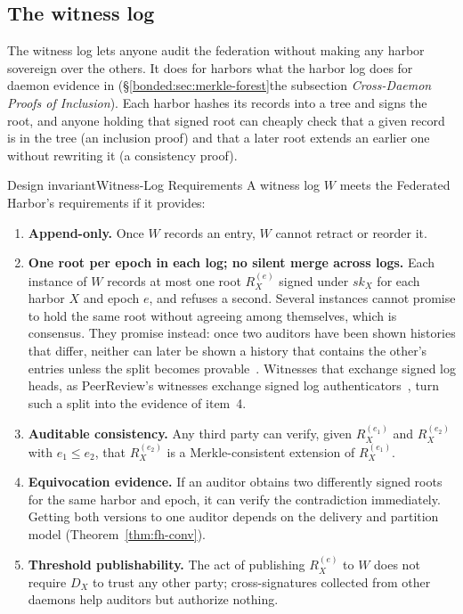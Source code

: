 \documentclass[11pt,a4paper]{article}
\theoremstyle{definition}
\theoremstyle{remark}
\begin{document}
\subsection{The witness log}\label{sec:fh-witness}
The witness log lets anyone audit the federation without making any harbor sovereign over the others. It does for harbors what the harbor log does for daemon evidence in  (\ifpdbook\S\ref{bonded:sec:merkle-forest}\else the subsection \emph{Cross-Daemon Proofs of Inclusion}\fi). Each harbor hashes its records into a tree and signs the root, and anyone holding that signed root can cheaply check that a given record is in the tree (an inclusion proof) and that a later root extends an earlier one without rewriting it (a consistency proof).
\begin{pdclaim}{Design invariant}{Witness-Log Requirements}
\setlength{\parskip}{4pt plus 1pt}
\label{prop:fh-witness}
A witness log $W$ meets the Federated Harbor's requirements if it provides:
\begin{enumerate}[nosep]
\item \textbf{Append-only.} Once $W$ records an entry, $W$ cannot retract or reorder it.
\item \textbf{One root per epoch in each log; no silent merge across logs.} Each instance of $W$ records at most one root $R_X^{(e)}$ signed under $\mathit{sk}_X$ for each harbor $X$ and epoch $e$, and refuses a second. Several instances cannot promise to hold the same root without agreeing among themselves, which is consensus. They promise  instead: once two auditors have been shown histories that differ, neither can later be shown a history that contains the other's entries unless the split becomes provable~. Witnesses that exchange signed log heads, as PeerReview's witnesses exchange signed log authenticators~, turn such a split into the evidence of item~4.
\item \textbf{Auditable consistency.} Any third party can verify, given $R_X^{(e_1)}$ and $R_X^{(e_2)}$ with $e_1 \le e_2$, that $R_X^{(e_2)}$ is a Merkle-consistent extension of $R_X^{(e_1)}$.
\item \textbf{Equivocation evidence.} If an auditor obtains two differently signed roots for the same harbor and epoch, it can verify the contradiction immediately. Getting both versions to one auditor depends on the delivery and partition model (Theorem~\ref{thm:fh-conv}).
\item \textbf{Threshold publishability.} The act of publishing $R_X^{(e)}$ to $W$ does not require $D_X$ to trust any other party; cross-signatures collected from other daemons help auditors but authorize nothing.
\end{enumerate}
\end{pdclaim}
\end{document}
